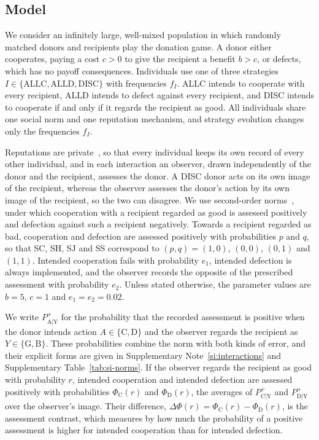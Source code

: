 \documentclass[10pt]{wlscirep}
\newcommand{\st}[1]{\mathrm{#1}}           %
\newcommand{\Pp}[1]{P^{+}_{\mathrm{#1}}}   %
\newcommand{\PhiC}{\Phi_{\mathrm{C}}}
\newcommand{\PhiD}{\Phi_{\mathrm{D}}}
\newcommand{\ALLC}{\mathrm{ALLC}}
\newcommand{\ALLD}{\mathrm{ALLD}}
\newcommand{\DISC}{\mathrm{DISC}}
\theoremstyle{plain}
\theoremstyle{remark}
\begin{document}
\subsection*{Model}

We consider an infinitely large, well-mixed population in which randomly matched donors and recipients play the donation game. A donor either cooperates, paying a cost $c>0$ to give the recipient a benefit $b>c$, or defects, which has no payoff consequences. Individuals use one of three strategies $I\in\{\ALLC,\ALLD,\DISC\}$ with frequencies $f_I$. ALLC intends to cooperate with every recipient, ALLD intends to defect against every recipient, and DISC intends to cooperate if and only if it regards the recipient as good. All individuals share one social norm and one reputation mechanism, and strategy evolution changes only the frequencies $f_I$.

Reputations are private~\cite{okada2018,hilbe2018,radzvilavicius2019}, so that every individual keeps its own record of every other individual, and in each interaction an observer, drawn independently of the donor and the recipient, assesses the donor. A DISC donor acts on its own image of the recipient, whereas the observer assesses the donor's action by its own image of the recipient, so the two can disagree. We use second-order norms~\cite{ohtsuki2004}, under which cooperation with a recipient regarded as good is assessed positively and defection against such a recipient negatively. Towards a recipient regarded as bad, cooperation and defection are assessed positively with probabilities $p$ and $q$, so that SC, SH, SJ and SS correspond to $(p,q)=(1,0)$, $(0,0)$, $(0,1)$ and $(1,1)$. Intended cooperation fails with probability $e_1$, intended defection is always implemented, and the observer records the opposite of the prescribed assessment with probability $e_2$. Unless stated otherwise, the parameter values are $b=5$, $c=1$ and $e_1=e_2=0.02$.

We write $\Pp{A|Y}$ for the probability that the recorded assessment is positive when the donor intends action $A\in\{\st C,\st D\}$ and the observer regards the recipient as $Y\in\{\st G,\st B\}$. These probabilities combine the norm with both kinds of error, and their explicit forms are given in Supplementary Note~\ref{si:interactions} and Supplementary Table~\ref{tab:si-norms}. If the observer regards the recipient as good with probability $r$, intended cooperation and intended defection are assessed positively with probabilities $\PhiC(r)$ and $\PhiD(r)$, the averages of $\Pp{C|Y}$ and $\Pp{D|Y}$ over the observer's image. Their difference, $\Delta\Phi(r)=\PhiC(r)-\PhiD(r)$, is the assessment contrast, which measures by how much the probability of a positive assessment is higher for intended cooperation than for intended defection.
\end{document}
